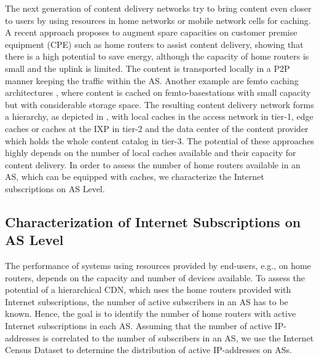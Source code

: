 The next generation of content delivery networks try to bring content even closer to users by using resources in home networks or mobile network cells for caching.
A recent approach \cite{valancius2009greening} proposes to augment spare capacities on customer premise equipment (CPE) such as home routers to assist content delivery, showing that there is a high potential to save energy, although the capacity of home routers is small and the uplink is limited.
The content is transported locally in a P2P manner keeping the traffic within the AS.
Another example are femto caching architectures \cite{golrezaei2013femtocaching}, where content is cached on femto-basestations with small capacity but with considerable storage space.
The resulting content delivery network forms a hierarchy, as depicted in , with local caches in the access network in tier-1, edge caches or caches at the IXP in tier-2 and the data center of the content provider which holds the whole content catalog in tier-3.
The potential of these approaches highly depends on the number of local caches available and their capacity for content delivery.
In order to assess the number of home routers available in an AS, which can be equipped with caches, we characterize the Internet subscriptions on AS Level.

%

\subsection{Characterization of Internet Subscriptions on AS Level}\label{sec:aslevel:census}

The performance of systems using resources provided by end-users, e.g., on home routers, depends on the capacity and number of devices available.
To assess the potential of a hierarchical CDN, which uses the home routers provided with Internet subscriptions, the number of active subscribers in an AS has to be known.
Hence, the goal is to identify the number of home routers with active Internet subscriptions in each AS.
Assuming that the number of active IP-addresses is correlated to the number of subscribers in an AS, we use the Internet Census Dataset to determine the distribution of active IP-addresses on ASs.

